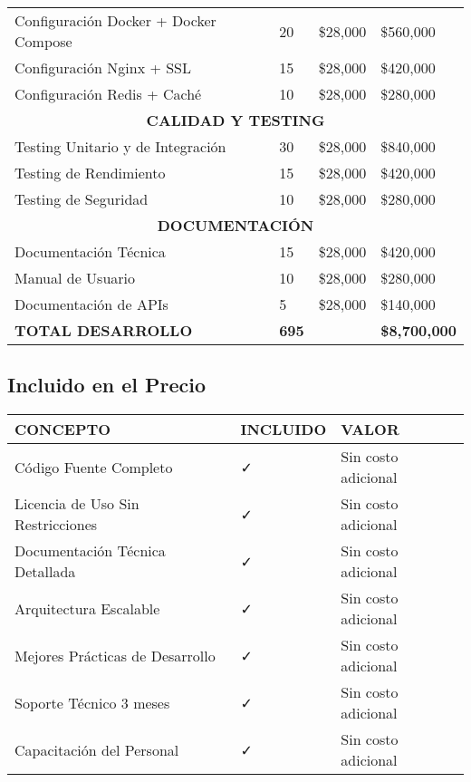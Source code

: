 \documentclass[12pt,a4paper]{article}
\begin{document}
\begin{longtable}{|p{5.5cm}|p{1.8cm}|p{1.8cm}|p{2.5cm}|}
\hline
Configuración Docker + Docker Compose & 20 & \$28,000 & \$560,000 \\
Configuración Nginx + SSL & 15 & \$28,000 & \$420,000 \\
Configuración Redis + Caché & 10 & \$28,000 & \$280,000 \\
\hline
\multicolumn{4}{c}{\textbf{CALIDAD Y TESTING}} \\
\hline
Testing Unitario y de Integración & 30 & \$28,000 & \$840,000 \\
Testing de Rendimiento & 15 & \$28,000 & \$420,000 \\
Testing de Seguridad & 10 & \$28,000 & \$280,000 \\
\hline
\multicolumn{4}{c}{\textbf{DOCUMENTACIÓN}} \\
\hline
Documentación Técnica & 15 & \$28,000 & \$420,000 \\
Manual de Usuario & 10 & \$28,000 & \$280,000 \\
Documentación de APIs & 5 & \$28,000 & \$140,000 \\
\hline
\rowcolor{lightgray}
\textbf{TOTAL DESARROLLO} & \textbf{695} & \textbf{} & \textbf{\$8,700,000} \\
\hline
\end{longtable}

\subsection{Incluido en el Precio}

\begin{longtable}{|p{6cm}|p{2.5cm}|p{2.5cm}|}
\hline
\rowcolor{headerblue}
\textbf{\color{white}CONCEPTO} & \textbf{\color{white}INCLUIDO} & \textbf{\color{white}VALOR} \\
\hline
\endhead

Código Fuente Completo & ✓ & Sin costo adicional \\
Licencia de Uso Sin Restricciones & ✓ & Sin costo adicional \\
Documentación Técnica Detallada & ✓ & Sin costo adicional \\
Arquitectura Escalable & ✓ & Sin costo adicional \\
Mejores Prácticas de Desarrollo & ✓ & Sin costo adicional \\
Soporte Técnico 3 meses & ✓ & Sin costo adicional \\
Capacitación del Personal & ✓ & Sin costo adicional \\
\hline
\end{longtable}
\end{document}
